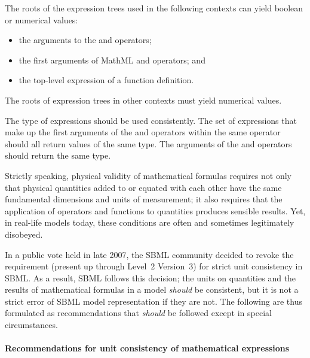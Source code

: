 The roots of the expression trees used in the following contexts can
yield boolean or numerical values:

\begin{itemize}\setlength{\parskip}{-0.2ex}

\item the arguments to the  and  operators;

\item the first arguments of MathML  and 
operators; and

\item the top-level expression of a function definition.

\end{itemize}

The roots of expression trees in other contexts must yield
numerical values.

The type of expressions should be used consistently.  The set of
expressions that make up the first arguments of the 
and  operators within the same 
operator should all return values of the same type. The arguments
of the  and  operators should return the same
type.


\label{sec:operator-arg-types}
\label{sec:unit-consistency}

Strictly speaking, physical validity of mathematical formulas
requires not only that physical quantities added to or equated
with each other have the same fundamental dimensions and units of
measurement; it also requires that the application of operators
and functions to quantities produces sensible results.  Yet, in
real-life models today, these conditions are often and sometimes
legitimately disobeyed.

In a public vote held in late 2007, the SBML community decided to
revoke the requirement (present up through Level~2 Version~3) for
strict unit consistency in SBML.  As a result, SBML \thisL follows
this decision; the units on quantities and the results of
mathematical formulas in a model \emph{should} be consistent, but
it is not a strict error of SBML model representation if they are
not.  The following are thus formulated as recommendations that
\emph{should} be followed except in special circumstances.


\paragraph{Recommendations for unit consistency of mathematical expressions}

